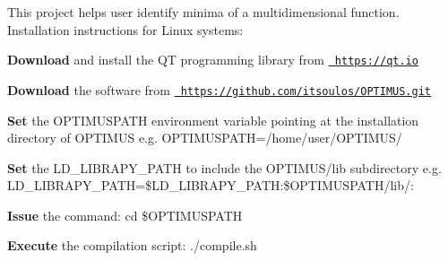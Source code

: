 This project helps user identify minima of a multidimensional function. Installation instructions for Linux systems\+:
\begin{DoxyItemize}
\item {\bfseries{Download}} and install the QT programming library from \href{https://qt.io}{\texttt{ https\+://qt.\+io}}
\item {\bfseries{Download}} the software from \href{https://github.com/itsoulos/OPTIMUS.git}{\texttt{ https\+://github.\+com/itsoulos/\+OPTIMUS.\+git}}
\item {\bfseries{Set}} the OPTIMUSPATH environment variable pointing at the installation directory of OPTIMUS e.\+g. OPTIMUSPATH=/home/user/\+OPTIMUS/
\item {\bfseries{Set}} the LD\+\_\+\+LIBRAPY\+\_\+\+PATH to include the OPTIMUS/lib subdirectory e.\+g. LD\+\_\+\+LIBRAPY\+\_\+\+PATH=\$\+LD\+\_\+\+LIBRAPY\+\_\+\+PATH\+:\$\+OPTIMUSPATH/lib/\+:
\item {\bfseries{Issue}} the command\+: cd \$\+OPTIMUSPATH
\item {\bfseries{Execute}} the compilation script\+: ./compile.sh 
\end{DoxyItemize}